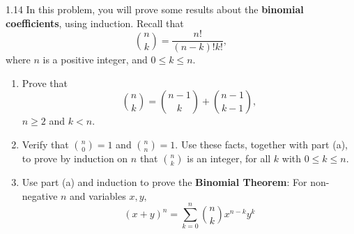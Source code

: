 \newpage
\begin{exercise}{1.14}
    In this problem, you will prove some results about the \textbf{binomial coefficients}, using induction. Recall that
    \[\binom{n}{k} = \frac{n!}{(n-k)!k!},\] where \(n\) is a positive integer, and \(0 \leq k \leq n\).
    \begin{enumerate}[label=(\alph*)]
        \item Prove that
        \[\binom{n}{k} = \binom{n-1}{k} + \binom{n-1}{k-1},\] \(n \geq 2\) and \(k < n\).
        \item Verify that \(\binom{n}{0} = 1\) and \(\binom{n}{n} = 1\). Use these facts, together with part (a), to prove
        by induction on \(n\) that \(\binom{n}{k}\) is an integer, for all \(k\) with \(0 \leq k \leq n\).
        \item Use part (a) and induction to prove the \textbf{Binomial Theorem}: For non-negative \(n\) and variables \(x,y,\)
        \[(x+y)^n = \sum_{k=0}^{n}\binom{n}{k}x^{n-k}y^k\]
    \end{enumerate}
\end{exercise}
